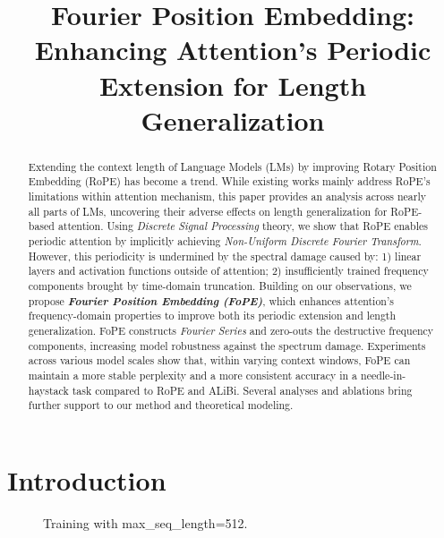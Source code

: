 \title{Fourier Position Embedding:\\Enhancing Attention's Periodic Extension for Length Generalization}



\maketitle
\begin{abstract}
Extending the context length of Language Models (LMs) by improving Rotary Position Embedding (RoPE) has become a trend.
While existing works mainly address RoPE's limitations within attention mechanism, this paper provides an analysis across nearly all parts of LMs, uncovering their adverse effects on length generalization for RoPE-based attention.
Using \textit{Discrete Signal Processing} theory, we show that RoPE enables periodic attention by implicitly achieving \textit{Non-Uniform Discrete Fourier Transform}.
However, this periodicity is undermined by the spectral damage caused by: 1) linear layers and activation functions outside of attention; 2) insufficiently trained frequency components brought by time-domain truncation. 
Building on our observations, we propose \textbf{\textit{Fourier Position Embedding (FoPE)}}, which enhances attention's frequency-domain properties to improve both its periodic extension and length generalization. 
FoPE constructs \textit{Fourier Series} and zero-outs the destructive frequency components, increasing model robustness against the spectrum damage.
Experiments across various model scales show that, within varying context windows, FoPE can maintain a more stable perplexity and a more consistent accuracy in a needle-in-haystack task compared to RoPE and ALiBi.
Several analyses and ablations bring further support to our method and theoretical modeling.

\end{abstract}

\section{Introduction}

\begin{figure}
    \hfill
    \caption{Training with max\_seq\_length=512.}
    \label{fig:c4_512}
\end{figure}

